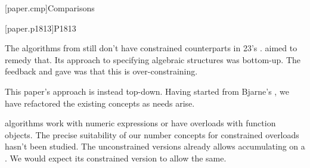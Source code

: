 

[paper.cmp]{Comparisons}

[paper.p1813]{P1813}

\pnum
The algorithms from  still don't have constrained counterparts in \Cpp{}23's .
 aimed to remedy that.
Its approach to specifying algebraic structures was bottom-up.
The feedback  and \hrefVI{} gave was that this is over-constraining.

\pnum
This paper's approach is instead top-down.
Having started from Bjarne's ,
we have refactored the existing concepts as needs arise.

\pnum
{} algorithms work with numeric expressions or have overloads with function objects.
The precise suitability of our number concepts for constrained overloads hasn't been studied.
The unconstrained versions  already allows accumulating on a .
We would expect its constrained version to allow the same.
